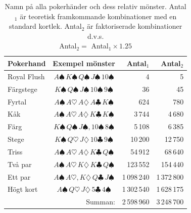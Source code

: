 \documentclass[swedish,a4paper]{article}
\begin{document}
\begin{table}[H] 
\captionsetup{width=0.5\textwidth, justification=centering}
\caption{Namn på alla pokerhänder och dess relativ mönster. Antal$_1$ är 
teoretisk framkommande kombinationer med en standard kortlek. Antal$_2$ är 
faktoriserade kombinationer d.v.s. \\ Antal$_2 = $ Antal$_1 \times 1.25$ }
\label{tab:all_poker_hands}
	\centering
	\begin{tabular}{|l|c|r|r|}
	
	\hline 
	Pokerhand 
	& Exempel mönster
	& Antal$_1$ 
	& Antal$_2$ 
	\\ \hline  

	Royal Flush 
	& $A\spadesuit\, K\spadesuit\, Q\spadesuit\, J\spadesuit\, 10\spadesuit$
	& 4 
	& 5
	\\ \hline

	Färgstege
	& $K\spadesuit\, Q\spadesuit\, J\spadesuit\, 10\spadesuit\, 9\spadesuit$
	& 36 
	& 45
	\\ \hline

	Fyrtal 
	& $A\spadesuit\,A\heartsuit\,A\diamondsuit\,A\clubsuit\, K\spadesuit$ 
	& 624 
	& 780
	\\ \hline

	Kåk 
	& $A\spadesuit\, A\heartsuit\, A\diamondsuit\, K\clubsuit\,K\spadesuit$ 
	& 3\,744
	& 4\,680
	\\ \hline

	Färg
	& $K\spadesuit\, Q\spadesuit\, J\spadesuit, 10\spadesuit\, 8\spadesuit$
	& 5\,108
	& 6\,385
	\\ \hline

	Stege 
	& $K\spadesuit\, Q\heartsuit\, J\diamondsuit\, 10\clubsuit\,9\spadesuit$ 
	& 10\,200
	& 12\,750
	\\ \hline
	Triss 
	& $A\spadesuit\, A\heartsuit\, A\diamondsuit\, K\clubsuit\, Q\spadesuit$
	& 54\,912
	& 68\,640
	\\ \hline

	Två par 
	& $A\spadesuit\, A\heartsuit\, K\diamondsuit\, K\clubsuit\, Q\spadesuit$
	& 123\,552
	& 154\,440
	\\ \hline

	Ett par 
	& $A\spadesuit\, A\heartsuit, K\diamondsuit\, Q\clubsuit\, J\spadesuit$ 
	& 1\,098\,240 
	& 1\,372\,800
	\\ \hline

	Högt kort
	& $A\spadesuit\, Q\heartsuit\, J\diamondsuit\, 5\clubsuit\, 4\spadesuit$
	& 1\,302\,540
	& 1\,628\,175
	\\ \hline

	 
	\multicolumn{2}{|r|}{Summan:} 
	& 2\,598\,960 
	& 3\,248\,700
	\\ \hline
\end{tabular}
\end{table}
\end{document}
